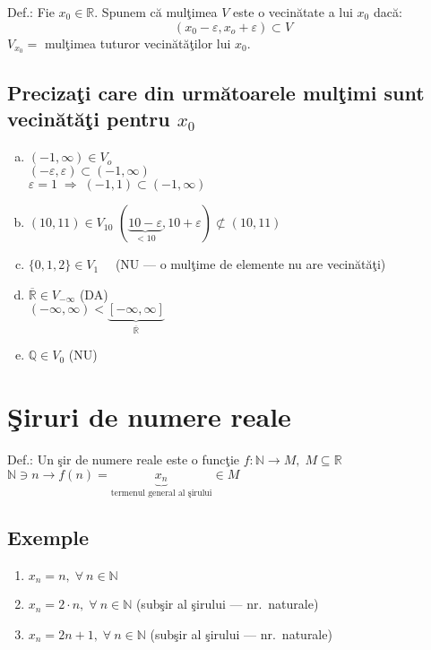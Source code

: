 \documentclass[a4paper, 12pt, notitlepage]{book}
\begin{document}
    \begin{center}
      Def.: Fie $x_{0} \in \mathbb{R}$. Spunem c\u{a} mul\c{t}imea $V$ este o vecin\u{a}tate a lui $x_{0}$ dac\u{a}:
      \[ \left(x_{0} - \varepsilon, x_{o} + \varepsilon \right) \subset V \]
      $V_{x_{0}} = $ mul\c{t}imea tuturor vecin\u{a}t\u{a}\c{t}ilor lui $x_{0}$.\\
    \end{center}

    \subsection{Preciza\c{t}i care din urm\u{a}toarele mul\c{t}imi sunt vecin\u{a}t\u{a}\c{t}i pentru $x_{0}$}
    \begin{enumerate}[a.]
      \item $(-1, \infty) \in V_{o}$\\[5pt]
            $(-\varepsilon, \varepsilon) \subset (-1, \infty)$\\[5pt]
            $\varepsilon = 1 \; \Rightarrow \; (-1, 1) \subset (-1, \infty)$
      \item $(10, 11) \in V_{10}$
            $(\underbrace{10 - \varepsilon}_{< 10}, 10 + \varepsilon) \not\subset (10,11)$
      \item $\{ 0,1,2 \} \in V_{1 } \quad $ (NU --- o mul\c{t}ime de elemente nu are vecin\u{a}t\u{a}\c{t}i)
      \item $\overline{\mathbb{R}} \in V_{-\infty}$ \quad (DA)\\[5pt]
            $(-\infty, \infty) < \underbrace{\left[-\infty, \infty \right]}_{\overline{\mathbb{R}}}$
      \item $\mathbb{Q} \in V_{0}$ \quad (NU)
    \end{enumerate}
    \section{\c{S}iruri de numere reale}
    Def.: Un \c{s}ir de numere reale este o func\c{t}ie $f : \mathbb{N} \to M,\; M \subseteq \mathbb{R}$\\[5pt]
    $\mathbb{N} \ni n \to f(n) = \underbrace{x_{n}}_{\text{termenul general al \c{s}irului}} \in M$
    \subsection{Exemple}
    \begin{enumerate}
      \item $x_n = n, \; \forall\ n \in \mathbb{N}$
      \item $x_{n} = 2 \cdot n,\; \forall\ n \in \mathbb{N}$ (sub\c{s}ir al \c{s}irului --- nr.\ naturale)
      \item $x_{n} = 2n+1,\; \forall\ n \in \mathbb{N}$ (sub\c{s}ir al \c{s}irului --- nr.\ naturale)
    \end{enumerate}
\end{document}
